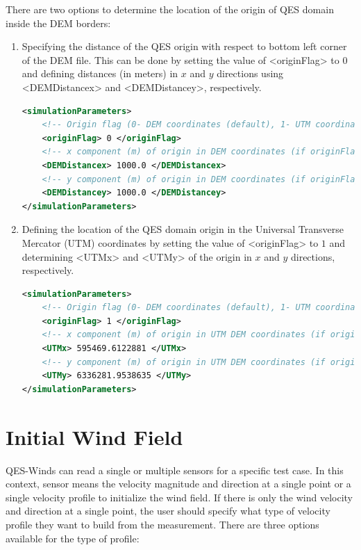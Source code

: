 There are two options to determine the location of the origin of QES domain inside the DEM borders:

\begin{enumerate}
\item Specifying the distance of the QES origin with respect to bottom left corner of the DEM file. This can be done by setting the value of <originFlag> to $0$ and defining distances (in meters) in $x$ and $y$ directions using <DEMDistancex> and <DEMDistancey>, respectively.

\begin{lstlisting}[language=XML]
<simulationParameters>
	<!-- Origin flag (0- DEM coordinates (default), 1- UTM coordinates) -->
	<originFlag> 0 </originFlag>		
	<!-- x component (m) of origin in DEM coordinates (if originFlag = 0) -->		
	<DEMDistancex> 1000.0 </DEMDistancex> 		
	<!-- y component (m) of origin in DEM coordinates (if originFlag = 0) -->	
	<DEMDistancey> 1000.0 </DEMDistancey> 				
</simulationParameters>
\end{lstlisting}

\item Defining the location of the QES domain origin in the Universal Transverse Mercator (UTM) coordinates by setting the value of <originFlag> to $1$ and determining <UTMx> and <UTMy> of the origin in $x$ and $y$ directions, respectively.

\begin{lstlisting}[language=XML]
<simulationParameters>
	<!-- Origin flag (0- DEM coordinates (default), 1- UTM coordinates) -->
	<originFlag> 1 </originFlag>	
	<!-- x component (m) of origin in UTM DEM coordinates (if originFlag = 1)-->				
	<UTMx> 595469.6122881 </UTMx>
	<!-- y component (m) of origin in UTM DEM coordinates (if originFlag = 1)--> 			
	<UTMy> 6336281.9538635 </UTMy> 					
</simulationParameters>
\end{lstlisting}

\end{enumerate}


\section{Initial Wind Field}

QES-Winds can read a single or multiple sensors for a specific test case. In this context, sensor means the velocity magnitude and direction at a single point or a single velocity profile to initialize the wind field. If there is only the wind velocity and direction at a single point, the user should specify what type of velocity profile they want to build from the measurement. There are three options available for the type of profile:

